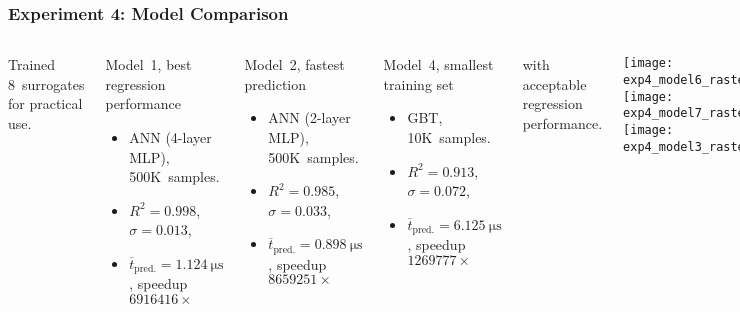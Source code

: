 \begin{frame}
	\frametitle{Experiment 4: Model Comparison}
	\begin{columns}
		Trained \alert{8~surrogates} for practical use.

		\begin{block}{\footnotesize Model~1, best regression performance}
			\footnotesize
			\linespread{0.6}\selectfont
			\begin{itemize}
				\setlength\itemsep{0em}
				\item
					ANN (4-layer MLP), 500K~samples.
				\item
					\alert{$R^2=\num{0.998}$,
					$\sigma=\num{0.013}$,}
				\item
					$\overline{t}_{\text{pred.}}=\SI{1.124}{\micro\second}$,
					speedup $\num{6916416} \times$
			\end{itemize}
		\end{block}
		\vspace{-0.6em}
		\begin{block}{\footnotesize Model~2, fastest prediction\textsuperscript{\textdagger}}
			\footnotesize
			\linespread{0.6}\selectfont
			\begin{itemize}
				\setlength\itemsep{0em}
				\item
					ANN (2-layer MLP), 500K~samples.
				\item
					$R^2=\num{0.985}$,
					$\sigma=\num{0.033}$,
				\item
					\alert{$\overline{t}_{\text{pred.}}=\SI{0.898}{\micro\second}$,
					speedup $\num{8659251} \times$}
			\end{itemize}
		\end{block}
		\vspace{-0.6em}
		\begin{block}{\footnotesize Model~4, smallest training set\textsuperscript{\textdagger}}
			\footnotesize
			\linespread{0.6}\selectfont
			\begin{itemize}
				\setlength\itemsep{0em}
				\item
					GBT, \alert{10K~samples.}
				\item
					$R^2=\num{0.913}$,
					$\sigma=\num{0.072}$,
				\item
					$\overline{t}_{\text{pred.}}=\SI{6.125}{\micro\second}$,
					speedup $\num{1269777} \times$
			\end{itemize}
		\end{block}
		\vspace{-0.6em}
		{\tiny
			\textsuperscript{\textdagger}
			with acceptable regression performance.
		}

		\texttt{[image: exp4\_model6\_rasterized]}\vspace{-8pt}\\
		\texttt{[image: exp4\_model7\_rasterized]}\vspace{-8pt}\\
		\texttt{[image: exp4\_model3\_rasterized]}
	\end{columns}
\end{frame}
